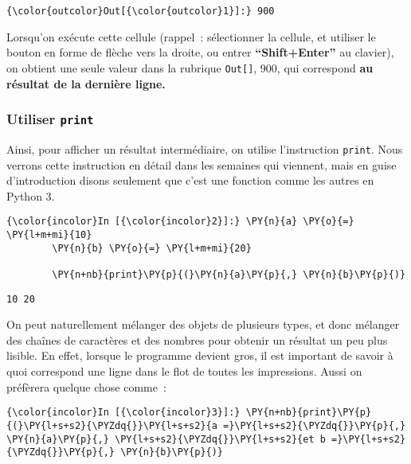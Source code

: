 \begin{Verbatim}[commandchars=\\\{\},frame=single,framerule=0.3mm,rulecolor=\color{cellframecolor}]
{\color{outcolor}Out[{\color{outcolor}1}]:} 900
\end{Verbatim}
            
    Lorsqu'on exécute cette cellule (rappel~: sélectionner la cellule, et
utiliser le bouton en forme de flèche vers la droite, ou entrer
\textbf{``Shift+Enter''} au clavier), on obtient une seule valeur dans
la rubrique \texttt{Out{[}{]}}, 900, qui correspond \textbf{au résultat
de la dernière ligne.}

    \hypertarget{utiliser-print}{%
\subsubsection{\texorpdfstring{Utiliser
\texttt{print}}{Utiliser print}}\label{utiliser-print}}

    Ainsi, pour afficher un résultat intermédiaire, on utilise l'instruction
\texttt{print}. Nous verrons cette instruction en détail dans les
semaines qui viennent, mais en guise d'introduction disons seulement que
c'est une fonction comme les autres en Python 3.

    \begin{Verbatim}[commandchars=\\\{\},frame=single,framerule=0.3mm,rulecolor=\color{cellframecolor}]
{\color{incolor}In [{\color{incolor}2}]:} \PY{n}{a} \PY{o}{=} \PY{l+m+mi}{10}
        \PY{n}{b} \PY{o}{=} \PY{l+m+mi}{20}
        
        \PY{n+nb}{print}\PY{p}{(}\PY{n}{a}\PY{p}{,} \PY{n}{b}\PY{p}{)}
\end{Verbatim}


    \begin{Verbatim}[commandchars=\\\{\},frame=single,framerule=0.3mm,rulecolor=\color{cellframecolor}]
10 20
\end{Verbatim}

    On peut naturellement mélanger des objets de plusieurs types, et donc
mélanger des chaînes de caractères et des nombres pour obtenir un
résultat un peu plus lisible. En effet, lorsque le programme devient
gros, il est important de savoir à quoi correspond une ligne dans le
flot de toutes les impressions. Aussi on préfèrera quelque chose comme~:

    \begin{Verbatim}[commandchars=\\\{\},frame=single,framerule=0.3mm,rulecolor=\color{cellframecolor}]
{\color{incolor}In [{\color{incolor}3}]:} \PY{n+nb}{print}\PY{p}{(}\PY{l+s+s2}{\PYZdq{}}\PY{l+s+s2}{a =}\PY{l+s+s2}{\PYZdq{}}\PY{p}{,} \PY{n}{a}\PY{p}{,} \PY{l+s+s2}{\PYZdq{}}\PY{l+s+s2}{et b =}\PY{l+s+s2}{\PYZdq{}}\PY{p}{,} \PY{n}{b}\PY{p}{)}
\end{Verbatim}


